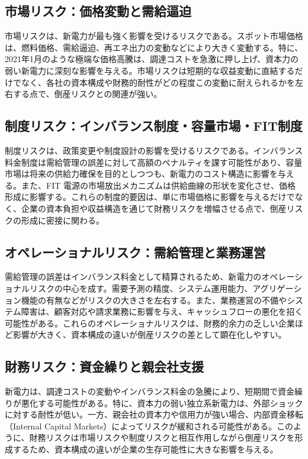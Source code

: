 \subsection{市場リスク：価格変動と需給逼迫}

市場リスクは、新電力が最も強く影響を受けるリスクである。スポット市場価格は、燃料価格、需給逼迫、再エネ出力の変動などにより大きく変動する。特に、2021年1月のような極端な価格高騰は、調達コストを急激に押し上げ、資本力の弱い新電力に深刻な影響を与える。市場リスクは短期的な収益変動に直結するだけでなく、各社の資本構成や財務的耐性がどの程度この変動に耐えられるかを左右する点で、倒産リスクとの関連が強い。

\subsection{制度リスク：インバランス制度・容量市場・FIT制度}

制度リスクは、政策変更や制度設計の影響を受けるリスクである。インバランス料金制度は需給管理の誤差に対して高額のペナルティを課す可能性があり、容量市場は将来の供給力確保を目的としつつも、新電力のコスト構造に影響を与える。また、FIT 電源の市場放出メカニズムは供給曲線の形状を変化させ、価格形成に影響する。これらの制度的要因は、単に市場価格に影響を与えるだけでなく、企業の資本負担や収益構造を通じて財務リスクを増幅させる点で、倒産リスクの形成に密接に関わる。

\subsection{オペレーショナルリスク：需給管理と業務運営}

需給管理の誤差はインバランス料金として精算されるため、新電力のオペレーショナルリスクの中心を成す。需要予測の精度、システム運用能力、アグリゲーション機能の有無などがリスクの大きさを左右する。また、業務運営の不備やシステム障害は、顧客対応や請求業務に影響を与え、キャッシュフローの悪化を招く可能性がある。これらのオペレーショナルリスクは、財務的余力の乏しい企業ほど影響が大きく、資本構成の違いが倒産リスクの差として顕在化しやすい。

\subsection{財務リスク：資金繰りと親会社支援}

新電力は、調達コストの変動やインバランス料金の急騰により、短期間で資金繰りが悪化する可能性がある。特に、資本力の弱い独立系新電力は、外部ショックに対する耐性が低い。一方、親会社の資本力や信用力が強い場合、内部資金移転（Internal Capital Markets）によってリスクが緩和される可能性がある\parencite{stein1997,almeida2004}。このように、財務リスクは市場リスクや制度リスクと相互作用しながら倒産リスクを形成するため、資本構成の違いが企業の生存可能性に大きな影響を与える。

